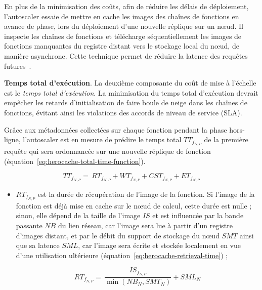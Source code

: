 {En plus de la minimisation des coûts, afin de réduire les délais de déploiement, l'autoscaler essaie de mettre en cache les images des chaînes de fonctions en avance de phase, lors du déploiement d'une nouvelle réplique sur un nœud. Il inspecte les chaînes de fonctions et télécharge séquentiellement les images de fonctions manquantes du registre distant vers le stockage local du nœud, de manière asynchrone. Cette technique permet de réduire la latence des requêtes futures~\cite{leeSPESOptimizingPerformanceResource2024a}.

\textbf{Temps total d'exécution}. La deuxième composante du coût de mise à l'échelle est le \textit{temps total d'exécution}. La minimisation du temps total d'exécution devrait empêcher les retards d'initialisation de faire boule de neige dans les chaînes de fonctions, évitant ainsi les violations des accords de niveau de service (\gls{SLA}).

Grâce aux métadonnées collectées sur chaque fonction pendant la phase hors-ligne, l'autoscaler est en mesure de prédire le temps total ${TT}_{{f}_{N, P}}$ de la première requête qui sera ordonnancée sur une nouvelle réplique de fonction (équation~\ref{eq:herocache-total-time-function}).

\begin{equation}
    {TT}_{{f}_{N, P}} = \, {RT}_{{f}_{N, P}} + {WT}_{{f}_{N, P}} + {CST}_{{f}_{N, P}} + {ET}_{{f}_{N, P}}
\label{eq:herocache-total-time-function}
\end{equation}

\begin{itemize}
    \item ${RT}_{{f}_{N, P}}$ est la durée de récupération de l'image de la fonction. Si l'image de la fonction est déjà mise en cache sur le nœud de calcul, cette durée est nulle ; sinon, elle dépend de la taille de l'image $IS$ et est influencée par la bande passante $NB$ du lien réseau, car l'image sera lue à partir d'un registre d'images distant, et par le débit du support de stockage du nœud $SMT$ ainsi que sa latence $SML$, car l'image sera écrite et stockée localement en vue d'une utilisation ultérieure (équation~\ref{eq:herocache-retrieval-time}) ;

    \begin{equation}
        {RT}_{{f}_{N, P}} = \, \frac{IS_{{f}_{N, P}}}{\min (NB_{N}, SMT_{N})} + SML_{N}
        \label{eq:herocache-retrieval-time}
    \end{equation}


\end{itemize}}
